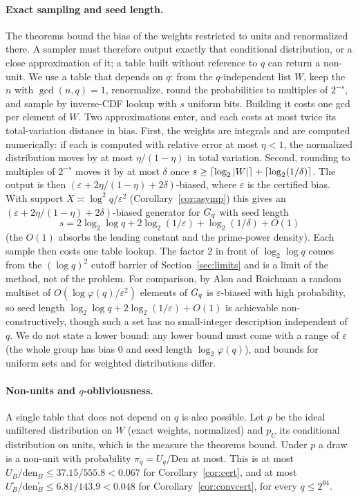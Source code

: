 \paragraph{Exact sampling and seed length.}
The theorems bound the bias of the weights restricted to units and renormalized there. A sampler must therefore output exactly
that conditional distribution, or a close approximation of it; a table built without reference to $q$ can return a non-unit. We
use a table that depends on $q$: from the $q$-independent list $W$, keep the $n$ with $\gcd(n,q)=1$, renormalize, round the
probabilities to multiples of $2^{-s}$, and sample by inverse-CDF lookup with $s$ uniform bits. Building it costs one gcd per element
of $W$. Two approximations enter, and each costs at most twice its total-variation distance in bias. First, the weights are
integrals and are computed numerically: if each is computed with relative error at most $\eta<1$, the normalized distribution moves by
at most $\eta/(1-\eta)$ in total variation. Second, rounding to multiples of $2^{-s}$ moves it by at most $\delta$ once
$s\ge\lceil\log_2\left\lvert W \right\rvert\rceil+\lceil\log_2(1/\delta)\rceil$. The output is then $(\varepsilon+2\eta/(1-\eta)+2\delta)$-biased, where $\varepsilon$ is the
certified bias.
With support $X\asymp\log^2q/\varepsilon^2$ (Corollary~\ref{cor:asymp}) this gives an $(\varepsilon+2\eta/(1-\eta)+2\delta)$-biased
generator for $G_q$ with seed length
\[
  s=2\log_2\log q+2\log_2(1/\varepsilon)+\log_2(1/\delta)+O(1)
\]
(the $O(1)$ absorbs the leading constant and the prime-power density). Each sample then costs one table lookup. The factor $2$ in front of $\log_2\log q$ comes from the $(\log q)^2$ cutoff barrier of
Section~\ref{sec:limits} and is a limit of the method, not of the problem. For comparison, by Alon and Roichman
\cite{alonroichman1994} a random multiset of $O(\log\varphi(q)/\varepsilon^2)$ elements of $G_q$ is $\varepsilon$-biased with high probability, so
seed length $\log_2\log q+2\log_2(1/\varepsilon)+O(1)$ is achievable non-constructively, though such a set has no small-integer
description independent of $q$. We do not state a lower bound: any lower bound must
come with a range of $\varepsilon$ (the whole group has bias $0$ and seed length $\log_2\varphi(q)$), and bounds for uniform sets and
for weighted distributions differ.

\paragraph{Non-units and $q$-obliviousness.}
A single table that does not depend on $q$ is also possible. Let $p$ be the ideal unfiltered distribution on $W$ (exact weights,
normalized) and $p_U$ its conditional distribution on units, which is the measure the theorems bound. Under $p$ a draw is a non-unit
with probability $\pi_q=U_q/\mathrm{Den}$ at most. This is at most $U_B/\mathrm{den}_B\le37.15/555.8<0.067$ for Corollary~\ref{cor:cert},
and at most $U^\square_B/\mathrm{den}^\square_B\le6.81/143.9<0.048$ for Corollary~\ref{cor:convcert}, for every $q\le2^{64}$.

